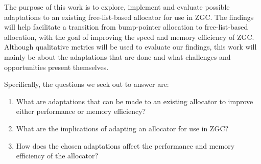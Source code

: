 
The purpose of this work is to explore, implement and evaluate possible adaptations to an existing free-list-based allocator for use in ZGC. The findings will help facilitate a transition from bump-pointer allocation to free-list-based allocation, with the goal of improving the speed and memory efficiency of ZGC. Although qualitative metrics will be used to evaluate our findings, this work will mainly be about the adaptations that are done and what challenges and opportunities present themselves.

Specifically, the questions we seek out to answer are:

\begin{enumerate}
    \item What are adaptations that can be made to an existing allocator to improve either performance or memory efficiency?
    \item What are the implications of adapting an allocator for use in ZGC?
    \item How does the chosen adaptations affect the performance and memory efficiency of the allocator?
\end{enumerate}

